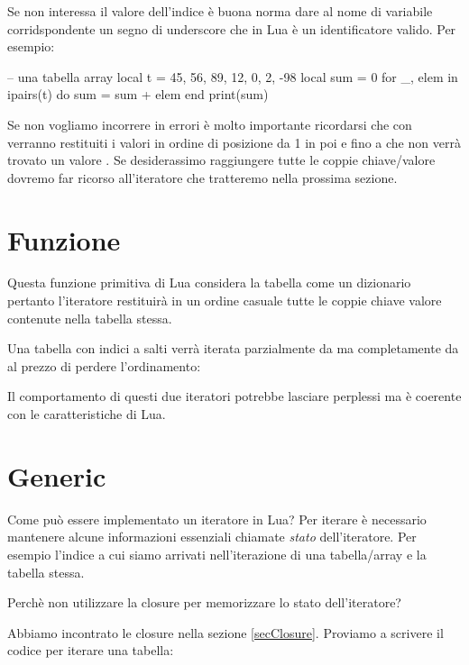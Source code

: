 Se non interessa il valore dell'indice è buona norma dare al nome di variabile
corridspondente un segno di underscore \key{\_} che in Lua è un identificatore
valido. Per esempio:
\begin{lines}
-- una tabella array
local t = {45, 56, 89, 12, 0, 2, -98}
local sum = 0
for _, elem in ipairs(t) do
    sum = sum + elem
end
print(sum)
\end{lines}

Se non vogliamo incorrere in errori è molto importante ricordarsi che con
 verranno restituiti i valori in ordine di posizione da 1 in poi e
fino a che non verrà trovato un valore . Se desiderassimo raggiungere
tutte le coppie chiave/valore dovremo far ricorso all'iteratore 
che tratteremo nella prossima sezione.


\section{Funzione }
\label{secFondPairsIterator}

Questa funzione primitiva di Lua considera la tabella come un dizionario
pertanto l'iteratore restituirà in un ordine casuale tutte le coppie chiave
valore contenute nella tabella stessa.

Una tabella con indici a salti verrà iterata parzialmente da  ma
completamente da  al prezzo di perdere l'ordinamento:

Il comportamento di questi due iteratori potrebbe lasciare perplessi ma è
coerente con le caratteristiche di Lua.


\section{Generic }

Come può essere implementato un iteratore in Lua? Per iterare è necessario
mantenere alcune informazioni essenziali chiamate \emph{stato} dell'iteratore.
Per esempio l'indice a cui siamo arrivati nell'iterazione di una tabella/array
e la tabella stessa.

Perchè non utilizzare la closure per memorizzare lo stato dell'iteratore?

Abbiamo incontrato le closure nella sezione \ref{secClosure}. Proviamo a
scrivere il codice per iterare una tabella:


